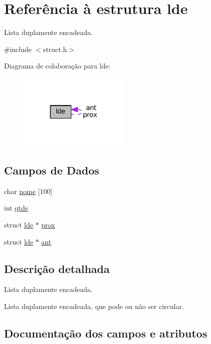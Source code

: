 \hypertarget{structlde}{}\section{Referência à estrutura lde}
\label{structlde}


Lista duplamente encadeada.  




{\ttfamily \#include $<$struct.\+h$>$}



Diagrama de colaboração para lde\+:\nopagebreak
\begin{figure}[H]
\begin{center}
\leavevmode
\includegraphics[width=151pt]{structlde__coll__graph}
\end{center}
\end{figure}
\subsection*{Campos de Dados}
\begin{DoxyCompactItemize}
\item 
char \hyperlink{structlde_aa4e90ca99702bac9e1c78503ad86acba}{nome} \mbox{[}100\mbox{]}
\item 
int \hyperlink{structlde_aa8a45bf920d47706309cd931134d5219}{qtde}
\item 
struct \hyperlink{structlde}{lde} $\ast$ \hyperlink{structlde_a842cbaea6d55e782335dcad1a6992695}{prox}
\item 
struct \hyperlink{structlde}{lde} $\ast$ \hyperlink{structlde_a9533d032f1309656dcf523f30de08484}{ant}
\end{DoxyCompactItemize}


\subsection{Descrição detalhada}
Lista duplamente encadeada. 

Lista duplamente encadeada, que pode ou não ser circular. 

\subsection{Documentação dos campos e atributos}
\mbox{\label{structlde_a9533d032f1309656dcf523f30de08484}} 
